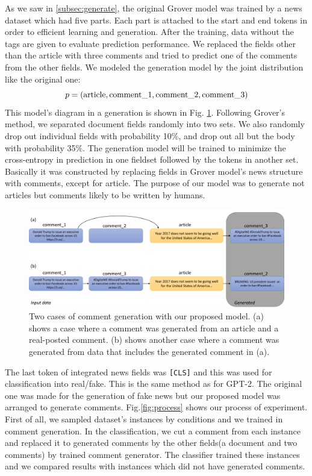\documentclass[conference]{IEEEtran}
\begin{document}
As we saw in \ref{subsec:generate}, the original Grover model was trained by a news dataset which had five parts.
Each part is attached to the start and end tokens in order to efficient learning and generation\cite{NIPS2019_9106}.
After the training, data without the tags are given to evaluate prediction performance.
We replaced the fields other than the article with three comments and tried to predict one of the comments from the other fields.
We modeled the generation model by the joint distribution like the original one:
\begin{equation}
    \label{eq:joint_distri}
    p = (\rm{article}, \rm{comment\_1}, \rm{comment\_2}, \rm{comment\_3})
\end{equation}
This model's diagram in a generation is shown in Fig. \ref{fig:method}.
Following Grover's method, we separated document fields randomly into two sets.
We also randomly drop out individual fields with probability 10\%, and drop out all but the body with probability 35\%\cite{NIPS2019_9106}.
The generation model will be trained to minimize the cross-entropy in prediction in one fieldset followed by the tokens in another set.
Basically it was constructed by replacing fields in Grover model’s news structure with comments, except for article.
The purpose of our model was to generate not articles but comments likely to be written by humans.

\begin{figure}[!t]
    \centering
    \includegraphics[width=\linewidth,pagebox=cropbox,clip]{fig_method.pdf}
    \caption{
        Two cases of comment generation with our proposed model. 
        (a) shows a case where a comment was generated from an article and a real-posted comment. 
        (b) shows another case where a comment was generated from data that includes the generated comment in (a).    }
    \label{fig:method}
\end{figure}

The last token of integrated news fields was \texttt{[CLS]} and this was used for classification into real/fake.
This is the same method as for GPT-2\cite{Radford_GPT2}.
The original one was made for the generation of fake news but our proposed model was arranged to generate comments.
Fig.\ref{fig:process} shows our process of experiment.
First of all, we sampled dataset's instances by conditions and we trained in comment generation.
In the classification, we cut a comment from each instance and replaced it to generated comments by the other fields(a document and two comments) by trained comment generator.
The classifier trained these instances and we compared results with instances which did not have generated comments.
\end{document}
